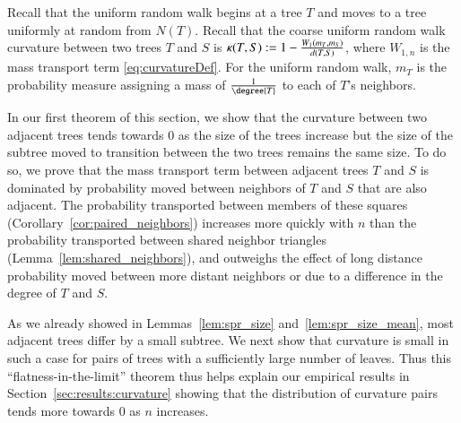 \documentclass[]{elsarticle}
\newcommand{\curvature}[2][]{%
    \ifthenelse{\equal{#1}{}}%
		{\kappa(#2)}%
		{\kappa_{#1}(#2)}%
}
\begin{document}
Recall that the uniform random walk begins at a tree $T$ and moves to a tree uniformly at random from $N(T)$.
Recall that the coarse uniform random walk curvature between two trees $T$ and $S$ is $\curvature{T, S} := 1 - \frac{W_1(m_T, m_S)}{d(T, S)}$, where $W_{1,n}$ is the mass transport term \eqref{eq:curvatureDef}.
For the uniform random walk, $m_T$ is the probability measure assigning a mass of $\frac{1}{\degree{T}}$ to each of $T$'s neighbors.

In our first theorem of this section, we show that the curvature between two adjacent trees tends towards 0 as the size of the trees increase but the size of the subtree moved to transition between the two trees remains the same size.
To do so, we prove that the mass transport term between adjacent trees $T$ and $S$ is dominated by probability moved between neighbors of $T$ and $S$ that are also adjacent.
The probability transported between members of these squares (Corollary~\ref{cor:paired_neighbors}) increases more quickly with $n$ than the probability transported between shared neighbor triangles (Lemma~\ref{lem:shared_neighbors}), and outweighs the effect of long distance probability moved between more distant neighbors or due to a difference in the degree of $T$ and $S$.

As we already showed in Lemmas~\ref{lem:spr_size} and~\ref{lem:spr_size_mean}, most adjacent trees differ by a small subtree.
We next show that curvature is small in such a case for pairs of trees with a sufficiently large number of leaves.
Thus this ``flatness-in-the-limit'' theorem thus helps explain our empirical results in Section~\ref{sec:results:curvature} showing that the distribution of curvature pairs tends more towards 0 as $n$ increases.
\end{document}
